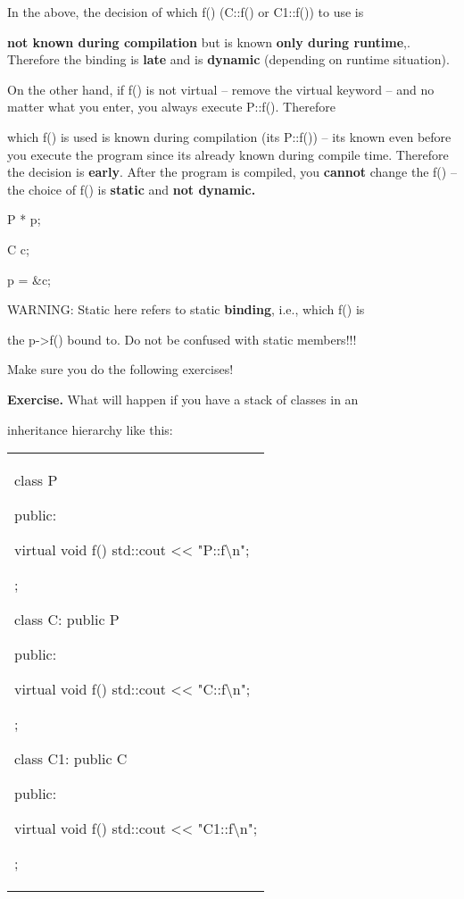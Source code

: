 In the above, the decision of which f() (C::f() or C1::f()) to use is

\textbf{not known during compilation }but is known \textbf{only during
runtime},. Therefore the binding is \textbf{late }and is \textbf{dynamic
}(depending on runtime situation).

On the other hand, if f() is not virtual -- remove the virtual keyword
-- and no matter what you enter, you always execute P::f(). Therefore

which f() is used is known during compilation (it\textquotesingle s
P::f()) -- it\textquotesingle s known even before you execute the
program since it\textquotesingle s already known during compile time.
Therefore the decision is \textbf{early}. After the program is compiled,
you \textbf{cannot }change the f() -- the choice of f() is
\textbf{static }and \textbf{not dynamic.}

\textbf{ }P * p;

C c;

p = \&c;

WARNING: Static here refers to static \textbf{binding}, i.e., which f()
is

the p-\textgreater f() bound to. Do not be confused with static
members!!!

Make sure you do the following exercises!

\textbf{Exercise. }What will happen if you have a stack of classes in an

inheritance hierarchy like this:

\begin{longtable}[]{@{}
  >{\raggedright\arraybackslash}p{}@{}}
\toprule\noalign{}
 \\
\midrule\noalign{}
\endhead
\bottomrule\noalign{}
\endlastfoot
class P

{

public:

virtual void f() { std::cout <<{}
"P::f\textbackslash n"; }

};

class C: public P

{

public:

virtual void f() { std::cout <<{}
"C::f\textbackslash n"; }

};

class C1: public C

{

public:

virtual void f() { std::cout <<{}
"C1::f\textbackslash n"; }

}; \\
\end{longtable}

